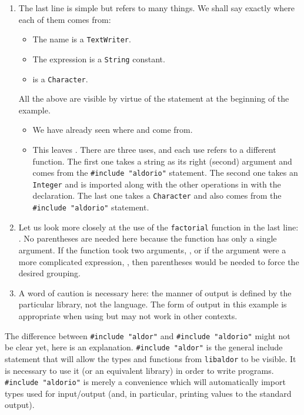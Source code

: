 \begin{enumerate}
\item The last line is simple but refers to many things.
We shall say exactly where each of them comes from:
\begin{itemize}
\item The name  is a \verb"TextWriter".
\item The expression  is a \verb"String" constant.
\item {} is a \verb"Character".
\end{itemize}
All the above are visible by virtue of the  statement
at the beginning of the example.
\begin{itemize}
\item We have already seen where  and  come from.
\item This leaves \ttin{<<}.  
There are three uses, and each use refers to a different function.  
The first one takes a string as its right (second) argument and comes
from the \verb+#include "aldorio"+ statement. 
The second one takes an \verb"Integer" and is imported along with
the other operations in with the  declaration.
The last one takes a \verb"Character" and also comes from
the \verb+#include "aldorio"+ statement.
\end{itemize}


\item Let us look more closely at the use of the \verb"factorial" function
in the last line: .
No parentheses are needed here because the function has only a single argument.
If the function took two arguments, \eg{} ,
or if the argument were a more complicated expression, \eg{} ,
then parentheses would be needed to force the desired grouping.

\item A word of caution is necessary here: the manner of output is defined
by the particular library, not the language.  
The form of output in this example is appropriate when using
 but may not work in other contexts.
\end{enumerate}

The difference between \verb+#include "aldor"+ and \verb+#include "aldorio"+
might not be clear yet, here is an
explanation. \verb+#include "aldor"+ is the general include statement
that will allow the types and functions from \verb+libaldor+ to be
visible. It is necessary to use it (or an equivalent library) in order
to write programs. \verb+#include "aldorio"+ is merely a convenience
which will automatically import types used for input/output (and, in
particular, printing values to the standard output).

